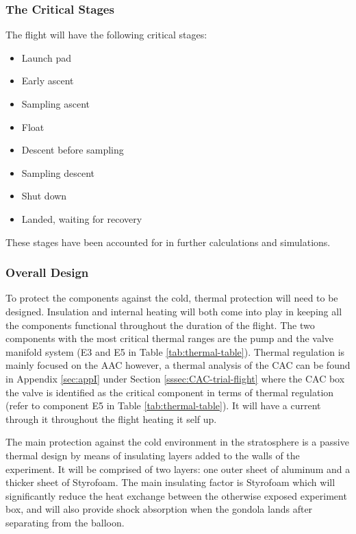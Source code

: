 \subsubsection{The Critical Stages}
The flight will have the following critical stages:
\begin{itemize}
    \item Launch pad
    \item Early ascent
    \item Sampling ascent
    \item Float
    \item Descent before sampling
    \item Sampling descent
    \item Shut down
    \item Landed, waiting for recovery
\end{itemize}
These stages have been accounted for in further calculations and simulations.

\subsubsection{Overall Design}
To protect the components against the cold, thermal protection will need to be designed. Insulation and internal heating will both come into play in keeping all the components functional throughout the duration of the flight. The two components with the most critical thermal ranges are the pump and the valve manifold system (E3 and E5 in Table \ref{tab:thermal-table}). Thermal regulation is mainly focused on the AAC however, a thermal analysis of the CAC can be found in Appendix \ref{sec:appI} under Section \ref{sssec:CAC-trial-flight} where the  CAC box the valve is identified as the critical component in terms of thermal regulation (refer to component E5 in Table \ref{tab:thermal-table}). It will have a current through it throughout the flight heating it self up.

The main protection against the cold environment in the stratosphere is a passive thermal design by means of  insulating layers added to the walls of the experiment. It will be comprised of two layers: one outer sheet of aluminum and a thicker sheet of Styrofoam. The main insulating factor is Styrofoam which will significantly reduce the heat exchange between the otherwise exposed experiment box, and will also provide shock absorption when the gondola lands after separating from the balloon.

